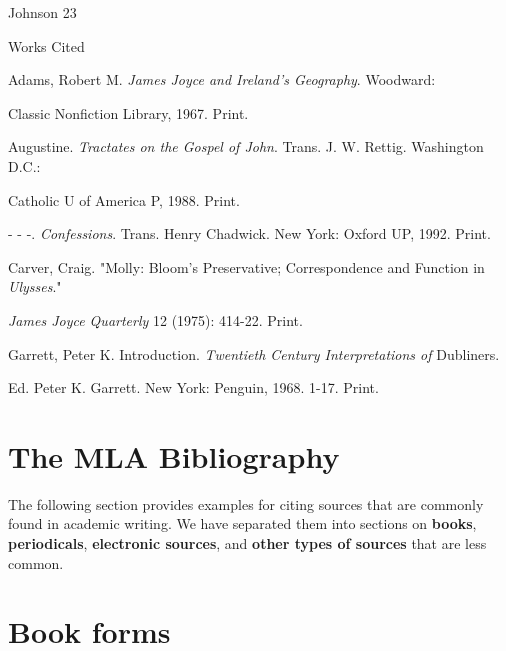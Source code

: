 \newpage
\thispagestyle{empty}
\begin{flushright}Johnson 23\end{flushright}
\begin{center}
Works Cited
\end{center}
\begin{Spacing}{2}
Adams, Robert M. \emph{James Joyce and Ireland's Geography}. Woodward: 

\hspace{.4in}Classic Nonfiction Library, 1967. Print.

Augustine. \emph{Tractates on the Gospel of John}. Trans. J. W. Rettig. Washington D.C.:

\hspace{.4in}Catholic U of America P, 1988. Print.

- - -. \emph{Confessions}. Trans. Henry Chadwick. New York: Oxford UP, 1992. Print.

Carver, Craig. "Molly: Bloom's Preservative; Correspondence and Function in \emph{Ulysses}."

\hspace{.4in}\emph{James Joyce Quarterly} 12 (1975): 414-22. Print.

Garrett, Peter K. Introduction. \emph{Twentieth Century Interpretations of} Dubliners.

\hspace{.4in}Ed. Peter K. Garrett. New York: Penguin, 1968. 1-17. Print.

\end{Spacing}

\newpage




										                

\section{The MLA Bibliography}

The following section provides examples for citing sources that are commonly found in
academic writing. We have separated them into sections on \textbf{books}, \textbf{periodicals}, \textbf{electronic
sources}, and \textbf{other types of sources} that are less common.


\section{Book forms}

